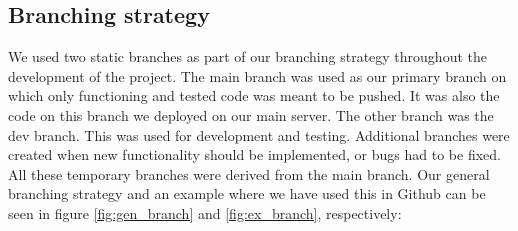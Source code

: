 \renewcommand{\arraystretch}{3}
\begin{table}[H]
    \centering
    \caption{Repository folders}
    \label{tab:repo_folders}
    \end{table}

\subsection{Branching strategy}
We used two static branches as part of our branching strategy throughout the development of the project. 
The main branch was used as our primary branch on which only functioning and tested code was meant to be pushed. It was
also the code on this branch we deployed on our main server. The other branch was the dev branch. This was used for 
development and testing. Additional branches were created when new functionality should be implemented, or bugs had to be
fixed. All these temporary branches were derived from the main branch. Our general branching strategy and an example where
we have used this in Github can be seen in figure \ref{fig:gen_branch} and \ref{fig:ex_branch}, respectively:

